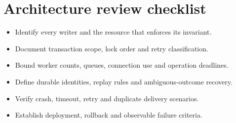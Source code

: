 
\section{Architecture review checklist}
\begin{itemize}
\item Identify every writer and the resource that enforces its invariant.
\item Document transaction scope, lock order and retry classification.
\item Bound worker counts, queues, connection use and operation deadlines.
\item Define durable identities, replay rules and ambiguous-outcome recovery.
\item Verify crash, timeout, retry and duplicate delivery scenarios.
\item Establish deployment, rollback and observable failure criteria.
\end{itemize}
